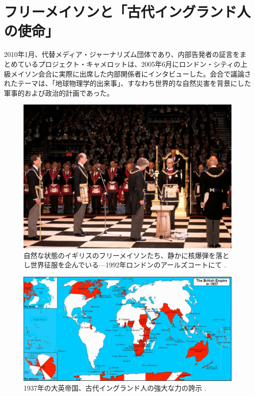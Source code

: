 \documentclass[10pt,twocolumn,letterpaper]{article}
\begin{document}
\section{フリーメイソンと「古代イングランド人の使命」}

2010年1月、代替メディア・ジャーナリズム団体であり、内部告発者の証言をまとめているプロジェクト・キャメロットは、2005年6月にロンドン・シティの上級メイソン会合に実際に出席した内部関係者にインタビューした\cite{4,6}。会合で議論されたテーマは、「地球物理学的出来事」、すなわち世界的な自然災害を背景にした軍事的および政治的計画であった。

\begin{figure}[b]
\begin{center}

\includegraphics[width=1\linewidth]{freemason.jpg}
\end{center}
   \caption{自然な状態のイギリスのフリーメイソンたち、静かに核爆弾を落とし世界征服を企んでいる—1992年ロンドンのアールズコートにて \cite{5}.}
\label{fig:1}
\label{fig:onecol}
\end{figure}

\begin{figure}[t]
\begin{center}
\includegraphics[width=1\textwidth]{british.jpg}
\end{center}
   \caption{1937年の大英帝国、古代イングランド人の強大な力の誇示 \cite{14}.}
   \label{fig:2}
\end{figure}
\end{document}

